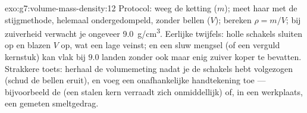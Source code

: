 \begin{solution}{exo:g7:volume-mass-density:12}
Protocol: weeg de ketting ($m$); meet haar  met de
stijgmethode, helemaal ondergedompeld, zonder bellen ($V$); bereken
$\rho = m/V$; bij zuiverheid verwacht je ongeveer \qty{9.0}{g/cm^3}.
Eerlijke twijfels: holle schakels sluiten  op en blazen $V$ op,
wat een lage  veinst; en een sluw mengsel (of een verguld
kernstuk) kan vlak bij $9.0$ landen zonder ook maar enig zuiver koper
te bevatten. Strakkere toets: herhaal de volumemeting nadat je de
schakels hebt volgezogen (schud de bellen eruit), en voeg een
onafhankelijke handtekening toe --- bijvoorbeeld de  (een
stalen kern verraadt zich onmiddellijk) of, in een werkplaats, een
gemeten smeltgedrag.
\end{solution}

